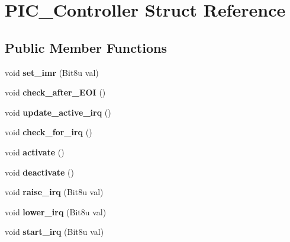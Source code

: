 \hypertarget{structPIC__Controller}{\section{P\-I\-C\-\_\-\-Controller Struct Reference}
\label{structPIC__Controller}
}
\subsection*{Public Member Functions}
\begin{DoxyCompactItemize}
\item 
\hypertarget{structPIC__Controller_a89930176a24e380c8f89aea96c51ef46}{void {\bfseries set\-\_\-imr} (Bit8u val)}\label{structPIC__Controller_a89930176a24e380c8f89aea96c51ef46}

\item 
\hypertarget{structPIC__Controller_a2cf56d38884e736e8a5ea3175ac0f55c}{void {\bfseries check\-\_\-after\-\_\-\-E\-O\-I} ()}\label{structPIC__Controller_a2cf56d38884e736e8a5ea3175ac0f55c}

\item 
\hypertarget{structPIC__Controller_ab10e18062827a16d6d85e0f3e5c48124}{void {\bfseries update\-\_\-active\-\_\-irq} ()}\label{structPIC__Controller_ab10e18062827a16d6d85e0f3e5c48124}

\item 
\hypertarget{structPIC__Controller_ae06a3991c287870754f1e071244727bb}{void {\bfseries check\-\_\-for\-\_\-irq} ()}\label{structPIC__Controller_ae06a3991c287870754f1e071244727bb}

\item 
\hypertarget{structPIC__Controller_a349ba0ea260e58353a4291e023e65f10}{void {\bfseries activate} ()}\label{structPIC__Controller_a349ba0ea260e58353a4291e023e65f10}

\item 
\hypertarget{structPIC__Controller_a4c1f93b670d2e8320344c6d800d46943}{void {\bfseries deactivate} ()}\label{structPIC__Controller_a4c1f93b670d2e8320344c6d800d46943}

\item 
\hypertarget{structPIC__Controller_a92928e2075384995b4bba13c76d10839}{void {\bfseries raise\-\_\-irq} (Bit8u val)}\label{structPIC__Controller_a92928e2075384995b4bba13c76d10839}

\item 
\hypertarget{structPIC__Controller_a4cf5804af1cf315621d8be3d2f5a21c1}{void {\bfseries lower\-\_\-irq} (Bit8u val)}\label{structPIC__Controller_a4cf5804af1cf315621d8be3d2f5a21c1}

\item 
\hypertarget{structPIC__Controller_af3e3d35547e29c3a42a9510fc73cd734}{void {\bfseries start\-\_\-irq} (Bit8u val)}\label{structPIC__Controller_af3e3d35547e29c3a42a9510fc73cd734}

\end{DoxyCompactItemize}
